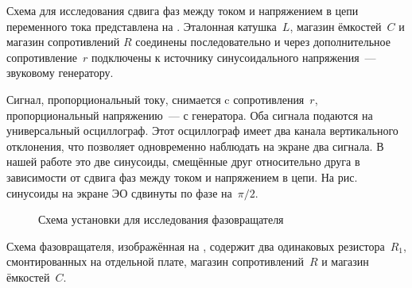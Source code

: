 \experiment  Схема для исследования сдвига фаз между током и напряжением в цепи переменного тока представлена на . Эталонная
катушка~$L$, магазин ёмкостей~$C$ и магазин сопротивлений $R$ соединены последовательно и через дополнительное
сопротивление~$r$ подключены к источнику синусоидального напряжения~--- звуковому генератору.

Сигнал, пропорциональный току, снимается c сопротивления~$r$, пропорциональный напряжению~--- с генератора. Оба сигнала
подаются на универсальный осциллограф. Этот осциллограф имеет два канала вертикального отклонения, что позволяет
одновременно наблюдать на экране два сигнала. В нашей работе это две синусоиды, смещённые друг относительно друга в
зависимости от сдвига фаз между током и напряжением в цепи. На рис.~ синусоиды на экране ЭО сдвинуты по фазе
на~$\pi/2$.


\begin{figure}[h!]
	\caption{Схема установки для исследования фазовращателя}
\end{figure}

Схема фазовращателя, изображённая на , содержит два одинаковых резистора~$R_1$, смонтированных на отдельной плате,
магазин сопротивлений~$R$ и магазин ёмкостей~$C$.

